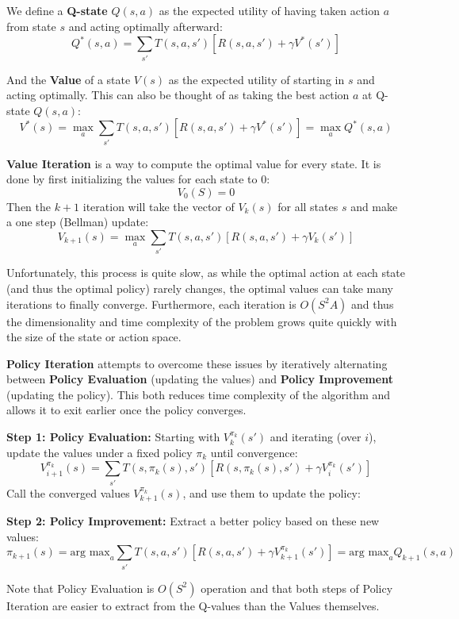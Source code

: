 \documentclass[a4paper]{article}
\begin{document}
We define a \textbf{Q-state} $Q(s, a)$ as the expected utility of having taken action $a$ from state $s$ and acting optimally afterward:
$$Q^*(s,a) = \sum_{s'}T(s, a, s')[R(s, a, s') + \gamma V^*(s')]$$

And the \textbf{Value} of a state $V(s)$ as the expected utility of starting in $s$ and acting optimally. This can also be thought of as taking the best action $a$ at Q-state $Q(s,a)$:
$$V^*(s) = \max_a \sum_{s'}T(s, a, s')[R(s, a, s') + \gamma V^*(s')] = \max_a Q^*(s, a)$$

\textbf{Value Iteration} is a way to compute the optimal value for every state. It is done by first initializing the values for each state to 0:
$$V_0(S) = 0$$
Then the $k+1$ iteration will take the vector of $V_k(s)$ for all states $s$ and make a one step (Bellman) update:
$$V_{k+1}(s) = \max_a \sum_{s'} T(s, a, s') [R(s,a,s') + \gamma V_k(s')]$$

Unfortunately, this process is quite slow, as while the optimal action at each state (and thus the optimal policy) rarely changes, the optimal values can take many iterations to finally converge. Furthermore, each iteration is $O(S^2A)$ and thus the dimensionality and time complexity of the problem grows quite quickly with the size of the state or action space.

\textbf{Policy Iteration} attempts to overcome these issues by iteratively alternating between \textbf{Policy Evaluation} (updating the values) and \textbf{Policy Improvement} (updating the policy). This both reduces time complexity of the algorithm and allows it to exit earlier once the policy converges.

\textbf{Step 1: Policy Evaluation:} Starting with $V_k^{\pi_k}(s')$ and iterating (over $i$), update the values under a fixed policy $\pi_k$ until convergence:
$$V^{\pi_k}_{i+1}(s) = \sum_{s'} T(s, \pi_k(s), s') [R(s,\pi_k(s),s') + \gamma V_i^{\pi_k}(s')]$$
Call the converged values $V^{\pi_k}_{k+1}(s)$, and use them to update the policy:

\textbf{Step 2: Policy Improvement:} Extract a better policy based on these new values:
$$\pi_{k+1}(s) = \text{arg max}_a \sum_{s'} T(s, a, s') [R(s,a,s')+ \gamma V^{\pi_k}_{k+1}(s')] = \text{arg max}_a Q_{k+1}(s,a)$$

Note that Policy Evaluation is $O(S^2)$ operation and that both steps of Policy Iteration are easier to extract from the Q-values than the Values themselves.
\end{document}
